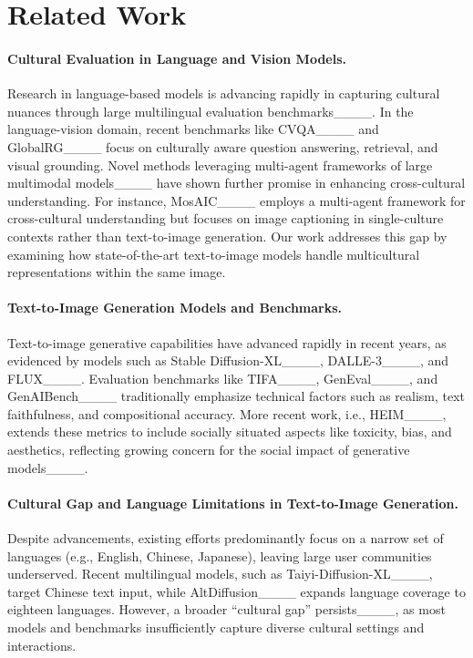 \section{Related Work}
\paragraph{Cultural Evaluation in Language and Vision Models.}

Research in language-based models is advancing rapidly in capturing cultural nuances through large multilingual evaluation benchmarks____. In the language-vision domain, recent benchmarks like CVQA____ and GlobalRG____ focus on culturally aware question answering, retrieval, and visual grounding. Novel methods leveraging multi-agent frameworks of large multimodal models____ have shown further promise in enhancing cross-cultural understanding. For instance, MosAIC____ employs a multi-agent framework for cross-cultural understanding but focuses on image captioning in single-culture contexts rather than text-to-image generation. Our work addresses this gap by examining how state-of-the-art text-to-image models handle multicultural representations within the same image.
\vspace{-0.8em}
\paragraph{Text-to-Image Generation Models and Benchmarks.} Text-to-image generative capabilities have advanced rapidly in recent years, as evidenced by models such as Stable Diffusion-XL____, DALLE-3____, and FLUX____. Evaluation benchmarks like TIFA____, GenEval____, and GenAIBench____ traditionally emphasize technical factors such as realism, text faithfulness, and compositional accuracy. More recent work, i.e., HEIM____, extends these metrics to include socially situated aspects like toxicity, bias, and aesthetics, reflecting growing concern for the social impact of generative models____.
\vspace{-0.8em}
\paragraph{Cultural Gap and Language Limitations in Text-to-Image Generation.} Despite advancements, existing efforts predominantly focus on a narrow set of languages (e.g., English, Chinese, Japanese), leaving large user communities underserved. 
Recent multilingual models, such as Taiyi-Diffusion-XL____, target Chinese text input, while AltDiffusion____ expands language coverage to eighteen languages. However, a broader ``cultural gap'' persists____, as most models and benchmarks insufficiently capture diverse cultural settings and interactions.
\vspace{-0.8em}
